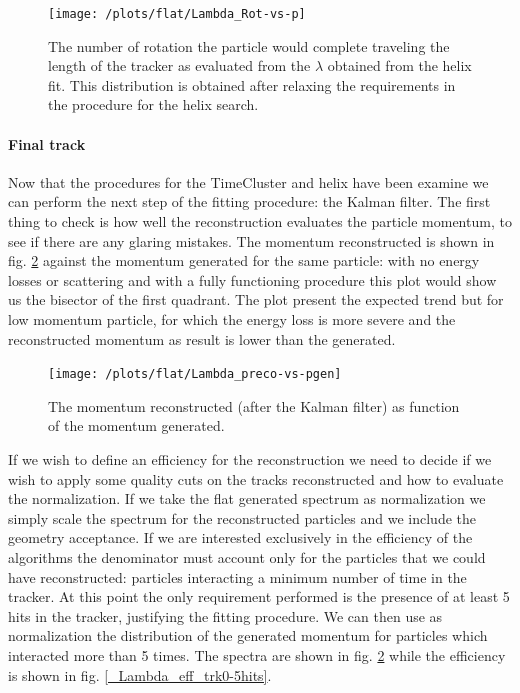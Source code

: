 \documentclass[12pt,a4paper,openright, oneside, titlepage]{book} %
\begin{document}
\begin{figure}[h!]
\centering
\texttt{[image: /plots/flat/Lambda\_Rot-vs-p]}
\caption{The number of rotation the particle would complete traveling the length of the tracker as evaluated from the $\lambda$ obtained from the helix fit. This distribution is obtained after relaxing the requirements in the procedure for the helix search.}
\label{_Lambda_Rot-vs-p}
\end{figure}

\paragraph{Final track}
Now that the procedures for the TimeCluster and helix have been examine we can perform the next step of the fitting procedure: the Kalman filter. 
The first thing to check is how well the reconstruction evaluates the particle momentum, to see if there are any glaring mistakes. 
The momentum reconstructed is shown in fig. \ref{_Lambda_preco-vs-pgen} against the momentum generated for the same particle: with no energy losses or scattering and with a fully functioning procedure this plot would show us the bisector of the first quadrant. 
The plot present the expected trend but for low momentum particle, for which the energy loss is more severe and the reconstructed momentum as result is lower than the generated. \\

\begin{figure}[h!]
\centering
\texttt{[image: /plots/flat/Lambda\_preco-vs-pgen]}
\caption{The momentum reconstructed (after the Kalman filter) as function of the momentum generated.}
\label{_Lambda_preco-vs-pgen}
\end{figure}

\noindent If we wish to define an efficiency for the reconstruction we need to decide if we wish to apply some quality cuts on the tracks reconstructed and how to evaluate the normalization. 
If we take the flat generated spectrum as normalization we simply scale the spectrum for the reconstructed particles and we include the geometry acceptance. 
If we are interested exclusively in the efficiency of the algorithms the denominator must account only for the particles that we could have reconstructed: particles interacting a minimum number of time in the tracker. 
At this point the only requirement performed is the presence of at least 5 hits in the tracker, justifying the fitting procedure. 
We can then use as normalization the distribution of the generated momentum for particles which interacted more than 5 times. 
The spectra are shown in fig. \ref{_Lambda_preco-vs-pgen} while the efficiency is shown in fig. \ref{_Lambda_eff_trk0-5hits}.\\
\end{document}
